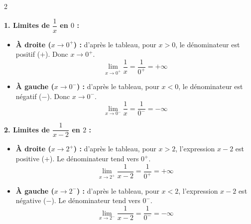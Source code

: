 \documentclass[12pt,a4paper]{article}
\begin{document}
\noindent
\begin{multicols}{2}

\noindent \textbf{1. Limites de $\dfrac{1}{x}$ en $0$ :}

\begin{center}
\end{center}

\begin{itemize}
    \item \textbf{À droite ($x \to 0^+$) :} d'après le tableau, pour $x > 0$, le dénominateur est positif ($+$). Donc $x \to 0^+$.
    \[
    \lim_{x \to 0^+} \frac{1}{x} = \frac{1}{0^+} = +\infty
    \]
    \item \textbf{À gauche ($x \to 0^-$) :} d'après le tableau, pour $x < 0$, le dénominateur est négatif ($-$). Donc $x \to 0^-$.
    \[
    \lim_{x \to 0^-} \frac{1}{x} = \frac{1}{0^-} = -\infty
    \]
\end{itemize}

\columnbreak

\noindent \textbf{2. Limites de $\dfrac{1}{x - 2}$ en $2$ :}

\begin{center}
\end{center}

\begin{itemize}
    \item \textbf{À droite ($x \to 2^+$) :} d'après le tableau, pour $x > 2$, l'expression $x - 2$ est positive ($+$). Le dénominateur tend vers $0^+$.
    \[
    \lim_{x \to 2^+} \frac{1}{x - 2} = \frac{1}{0^+} = +\infty
    \]
    \item \textbf{À gauche ($x \to 2^-$) :} d'après le tableau, pour $x < 2$, l'expression $x - 2$ est négative ($-$). Le dénominateur tend vers $0^-$.
    \[
    \lim_{x \to 2^-} \frac{1}{x - 2} = \frac{1}{0^-} = -\infty
    \]
\end{itemize}

\end{multicols}
\end{document}
